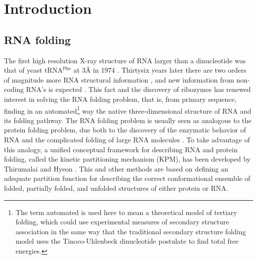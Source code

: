 \chapter{Introduction}
\label{introduction} 

\section{RNA folding}
The first  high resolution X-ray structure  of RNA larger
than a dinucleotide was  that of yeast tRNA$^{\textrm{Phe}}$ at 3{\AA}
in 1974 \cite{robertus1974, kim1974}. Thirtysix years later there are two
orders of magnitude more RNA structural information \cite{noller2005},
and new  information from non-coding RNA's is  expected \cite{weinberg2009}.  This  fact and
the discovery  of ribozymes \cite{kruger1982,  takada1983} has renewed
interest in  solving the RNA folding problem, that
is, from  primary sequence, finding in  an automated\footnote{The term
  automated  is used  here to  mean  a theoretical  model of  tertiary
  folding,  which   could  use  experimental   measures  of  secondary
  structure association in the same way that the traditional secondary
  structure  folding  model  \cite{zuker1989, hofacker1994}  uses  the
  Tinoco-Uhlenbeck  dinucleotide  postulate  \cite{borer1974} to  find
  total free energies.} way  the native three-dimensional structure of
RNA  and  its  folding  pathway. The  RNA  folding
problem is usually  seen as analogous to the  protein folding problem,
due  both  to   the  discovery  of  the  enzymatic   behavior  of  RNA
\cite{kruger1982, takada1983} and the complicated folding of large RNA
molecules  \cite{batey1999}.  To  take  advantage of  this analogy,  a
unified conceptual  framework for describing RNA  and protein folding,
called the kinetic partitioning mechanism (KPM), has been developed by
Thirumalai and Hyeon \cite{thirumalai2005}. This and other methods are
based on  defining an adequate  partition function for  describing the
correct  conformational  ensemble  of  folded, partially  folded,  and
unfolded  structures   \cite{chen1995,  chen1998,  thirumalai1996}  of
either protein or RNA.

